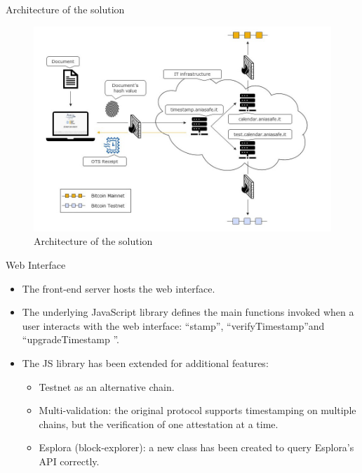 \documentclass[usenames,dvipsnames]{beamer}
\begin{document}
     \begin{frame}{Architecture of the solution}
     \begin{figure}
         \centering
         \includegraphics[width=0.92\linewidth]{Images/project-stamping.png}
         \caption{Architecture of the solution}
     \end{figure}
    \end{frame}
    
    \begin{frame}{Web Interface}
        \begin{itemize}
            \item The front-end server hosts the \alert{web interface}.
            \item The underlying \alert{JavaScript library} defines the \alert{main functions} invoked when a user interacts with the web interface: \textquotedblleft \alert{stamp}\textquotedblright, \textquotedblleft \alert{verifyTimestamp}\textquotedblright and \textquotedblleft \alert{upgradeTimestamp} \textquotedblright.
            \item The \alert{JS library} has been extended for \alert{additional features}:
            \begin{itemize}
                \item \alert{Testnet} as an alternative chain.
                \item \alert{Multi-validation}: the original protocol supports timestamping on multiple chains, but the verification of one attestation at a time.
                \item \alert{Esplora} (block-explorer): a new class has been created to query Esplora's API correctly.
            \end{itemize}
        \end{itemize}
    \end{frame}
    
\end{document}
